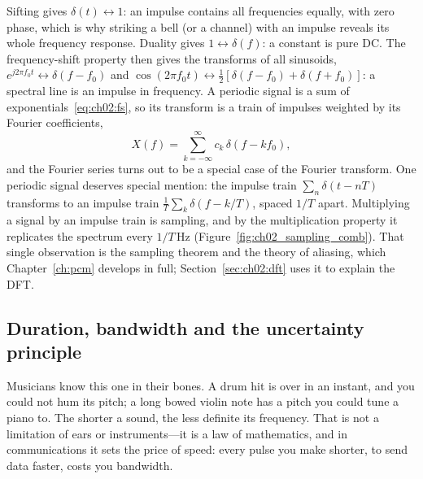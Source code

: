 

Sifting gives $\delta(t)\leftrightarrow1$: an impulse contains all frequencies equally, with zero
phase, which is why striking a bell (or a channel) with an impulse reveals its whole frequency
response. Duality gives $1\leftrightarrow\delta(f)$: a constant is pure DC. The frequency-shift
property then gives the transforms of all sinusoids, $e^{j2\pi f_0t}\leftrightarrow\delta(f-f_0)$
and $\cos(2\pi f_0t)\leftrightarrow\tfrac12[\delta(f-f_0)+\delta(f+f_0)]$: a spectral line is an
impulse in frequency. A periodic signal is a sum of exponentials~\eqref{eq:ch02:fs}, so its
transform is a train of impulses weighted by its Fourier coefficients,
\begin{equation}
X(f)=\sum_{k=-\infty}^{\infty}c_k\,\delta(f-kf_0),
\label{eq:ch02:periodicft}
\end{equation}
and the Fourier series turns out to be a special case of the Fourier transform. One periodic signal
deserves special mention: the impulse train $\sum_n\delta(t-nT)$ transforms to an impulse train
$\frac1T\sum_k\delta(f-k/T)$, spaced $1/T$ apart. Multiplying a signal by an impulse train is
sampling, and by the multiplication property it replicates the spectrum every $1/T$\,Hz
(Figure~\ref{fig:ch02_sampling_comb}). That single observation is the sampling theorem and the theory
of aliasing, which Chapter~\ref{ch:pcm} develops in full; Section~\ref{sec:ch02:dft} uses it to
explain the DFT.

\subsection{Duration, bandwidth and the uncertainty principle}
\label{sec:ch02:uncertainty}

Musicians know this one in their bones. A drum hit is over in an instant, and you could not hum its
pitch; a long bowed violin note has a pitch you could tune a piano to. The shorter a sound, the
less definite its frequency. That is not a limitation of ears or instruments---it is a law of
mathematics, and in communications it sets the price of speed: every pulse you make shorter, to send
data faster, costs you bandwidth.

